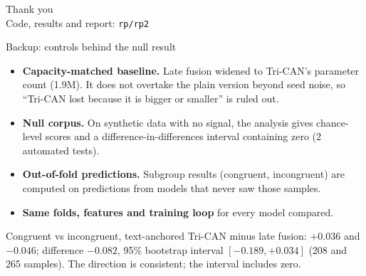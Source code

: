 \documentclass[aspectratio=169,10pt]{beamer}
\begin{document}
{
\begin{frame}[plain]
\vspace{2.2cm}
\begin{center}
{\color{white}\LARGE Thank you}\\[0.4cm]
{\color{white!70}\normalsize Code, results and report: \texttt{rp/rp2}}
\end{center}
\end{frame}
}

\appendix
\begin{frame}[t]{Backup: controls behind the null result}
\begin{itemize}
\item \textbf{Capacity-matched baseline.} Late fusion widened to Tri-CAN's parameter
      count (1.9M). It does not overtake the plain version beyond seed noise,
      so ``Tri-CAN lost because it is bigger or smaller'' is ruled out.
\item \textbf{Null corpus.} On synthetic data with no signal, the analysis gives chance-level
      scores and a difference-in-differences interval containing zero (2 automated tests).
\item \textbf{Out-of-fold predictions.} Subgroup results (congruent, incongruent) are
      computed on predictions from models that never saw those samples.
\item \textbf{Same folds, features and training loop} for every model compared.
\end{itemize}
\vspace{0.3cm}
\small Congruent vs incongruent, text-anchored Tri-CAN minus late fusion:
$+0.036$ and $-0.046$; difference $-0.082$, 95\% bootstrap interval $[-0.189, +0.034]$
(208 and 265 samples). The direction is consistent; the interval includes zero.
\end{frame}
\end{document}
